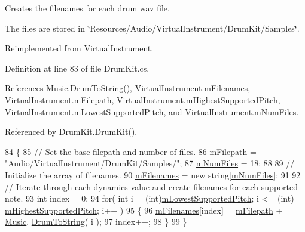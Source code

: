 Creates the filenames for each drum wav file. 

The files are stored in \char`\"{}\+Resources/\+Audio/\+Virtual\+Instrument/\+Drum\+Kit/\+Samples\char`\"{}. 

Reimplemented from \hyperlink{group___v_i_base_virt_func_gaacfc9521214176292bfb9665556fb991}{Virtual\+Instrument}.



Definition at line 83 of file Drum\+Kit.\+cs.



References Music.\+Drum\+To\+String(), Virtual\+Instrument.\+m\+Filenames, Virtual\+Instrument.\+m\+Filepath, Virtual\+Instrument.\+m\+Highest\+Supported\+Pitch, Virtual\+Instrument.\+m\+Lowest\+Supported\+Pitch, and Virtual\+Instrument.\+m\+Num\+Files.



Referenced by Drum\+Kit.\+Drum\+Kit().


\begin{DoxyCode}
84     \{
85         \textcolor{comment}{// Set the base filepath and number of files.}
86         \hyperlink{group___v_i_base_pro_var_gac428224be859933d720a9c533fdb5643}{mFilepath} = \textcolor{stringliteral}{"Audio/VirtualInstrument/DrumKit/Samples/"};
87         \hyperlink{group___v_i_base_pro_var_ga9a602db8c9833ce75d95dd453c27d341}{mNumFiles} = 18;
88 
89         \textcolor{comment}{// Initialize the array of filenames.}
90         \hyperlink{group___v_i_base_pro_var_gab2add474ca506357688b5dd08cac4cb5}{mFilenames} = \textcolor{keyword}{new} \textcolor{keywordtype}{string}[\hyperlink{group___v_i_base_pro_var_ga9a602db8c9833ce75d95dd453c27d341}{mNumFiles}];
91 
92         \textcolor{comment}{// Iterate through each dynamics value and create filenames for each supported note.}
93         \textcolor{keywordtype}{int} index = 0;
94         \textcolor{keywordflow}{for}( \textcolor{keywordtype}{int} i = (\textcolor{keywordtype}{int})\hyperlink{group___v_i_base_pro_var_ga3cae52b1bcc0178a8a6b03c7aaf7aac8}{mLowestSupportedPitch}; i <= (int)
      \hyperlink{group___v_i_base_pro_var_ga61fb2c33b53a0f663047779d7ceb18f3}{mHighestSupportedPitch}; i++ )
95         \{
96             \hyperlink{group___v_i_base_pro_var_gab2add474ca506357688b5dd08cac4cb5}{mFilenames}[index] = \hyperlink{group___v_i_base_pro_var_gac428224be859933d720a9c533fdb5643}{mFilepath} + \hyperlink{class_music}{Music}.
      \hyperlink{group___music_stat_func_gaf5f64ebe9a7e036e07f283e41f26d22b}{DrumToString}( i );
97             index++;
98         \}
99     \}
\end{DoxyCode}
\mbox{\label{group___drum_virt_func_gad14c6155e6ec62f26a30261e273d6379}} 
